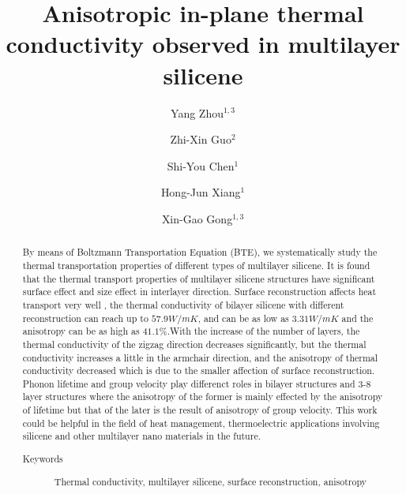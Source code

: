 \documentclass[%
 reprint,
 amsmath,amssymb,
 aps,
 prb,
]{revtex4-1}
\begin{document}
\title{Anisotropic in-plane thermal conductivity observed in multilayer silicene}
\author{Yang Zhou${}^{1,3}$}
\author{Zhi-Xin Guo${}^{2}$}
\author{Shi-You Chen${}^{1}$}
\author{Hong-Jun Xiang${}^{1}$}
\author{Xin-Gao Gong${}^{1,3}$}
\begin{abstract}
  By means of Boltzmann Transportation Equation (BTE), we systematically study the thermal transportation properties of different types of multilayer silicene. It is found that the thermal transport properties of multilayer silicene structures have significant surface effect and size effect in interlayer direction. Surface reconstruction affects heat transport very well , the thermal conductivity of bilayer silicene with different reconstruction can reach up to $57.9 W/mK$, and can be as low as $3.31 W/mK$ and the anisotropy can be as high as $41.1\%$.With the increase of the number of layers, the thermal conductivity of the zigzag direction decreases significantly, but the thermal conductivity increases a little in the armchair direction, and the anisotropy of thermal conductivity decreased which is due to the smaller affection of surface reconstruction. Phonon lifetime and group velocity play differenct roles in bilayer structures and 3-8 layer structures where the anisotropy of the former is mainly effected by the anisotropy of lifetime but that of the later is the result of anisotropy of group velocity.  This work could be helpful in the field of heat management, thermoelectric applications involving silicene and other multilayer nano materials in the future.
  \begin{description}
    \item[Keywords]
          Thermal conductivity, multilayer silicene, surface reconstruction, anisotropy
  \end{description}
\end{abstract}

\maketitle
\end{document}
